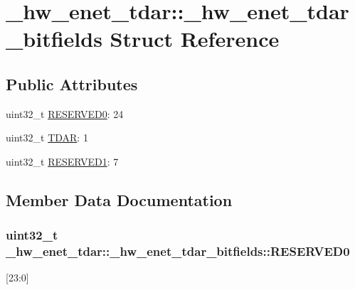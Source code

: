 \hypertarget{struct__hw__enet__tdar_1_1__hw__enet__tdar__bitfields}{}\section{\+\_\+hw\+\_\+enet\+\_\+tdar\+:\+:\+\_\+hw\+\_\+enet\+\_\+tdar\+\_\+bitfields Struct Reference}
\label{struct__hw__enet__tdar_1_1__hw__enet__tdar__bitfields}
\subsection*{Public Attributes}
\begin{DoxyCompactItemize}
\item 
uint32\+\_\+t \hyperlink{struct__hw__enet__tdar_1_1__hw__enet__tdar__bitfields_a8d204cc15ff247554f5d33c99dbbc5b4}{R\+E\+S\+E\+R\+V\+E\+D0}\+: 24
\item 
uint32\+\_\+t \hyperlink{struct__hw__enet__tdar_1_1__hw__enet__tdar__bitfields_a48160d7dfea7d86035eec5bae27a9548}{T\+D\+AR}\+: 1
\item 
uint32\+\_\+t \hyperlink{struct__hw__enet__tdar_1_1__hw__enet__tdar__bitfields_a376799321f66e829ea1b921c8b1f7d2d}{R\+E\+S\+E\+R\+V\+E\+D1}\+: 7
\end{DoxyCompactItemize}


\subsection{Member Data Documentation}
\subsubsection[{\texorpdfstring{R\+E\+S\+E\+R\+V\+E\+D0}{RESERVED0}}]{\setlength{\rightskip}{0pt plus 5cm}uint32\+\_\+t \+\_\+hw\+\_\+enet\+\_\+tdar\+::\+\_\+hw\+\_\+enet\+\_\+tdar\+\_\+bitfields\+::\+R\+E\+S\+E\+R\+V\+E\+D0}\hypertarget{struct__hw__enet__tdar_1_1__hw__enet__tdar__bitfields_a8d204cc15ff247554f5d33c99dbbc5b4}{}\label{struct__hw__enet__tdar_1_1__hw__enet__tdar__bitfields_a8d204cc15ff247554f5d33c99dbbc5b4}
\mbox{[}23\+:0\mbox{]} 

